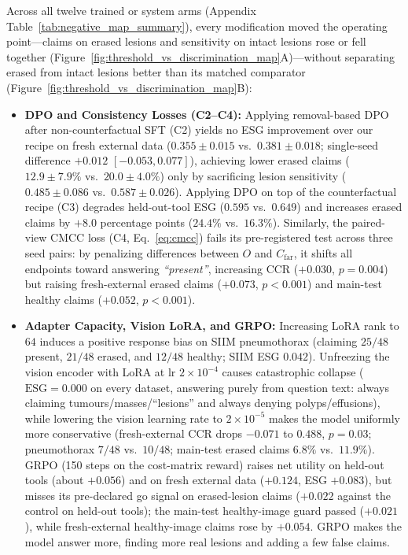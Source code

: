 \documentclass{article} %
\begin{document}
Across all twelve trained or system arms (Appendix Table~\ref{tab:negative_map_summary}), every modification moved the operating point---claims on erased lesions and sensitivity on intact lesions rose or fell together (Figure~\ref{fig:threshold_vs_discrimination_map}A)---without separating erased from intact lesions better than its matched comparator (Figure~\ref{fig:threshold_vs_discrimination_map}B):
\begin{itemize}[leftmargin=*,nosep]
    \item \textbf{DPO and Consistency Losses (C2--C4):} Applying removal-based DPO after non-counterfactual SFT (C2) yields no ESG improvement over our recipe on fresh external data ($0.355 \pm 0.015$ vs.\ $0.381 \pm 0.018$; single-seed difference $+0.012$ $[-0.053, 0.077]$), achieving lower erased claims ($12.9 \pm 7.9\%$ vs.\ $20.0 \pm 4.0\%$) only by sacrificing lesion sensitivity ($0.485 \pm 0.086$ vs.\ $0.587 \pm 0.026$). Applying DPO on top of the counterfactual recipe (C3) degrades held-out-tool ESG ($0.595$ vs.\ $0.649$) and increases erased claims by $+8.0$ percentage points ($24.4\%$ vs.\ $16.3\%$). Similarly, the paired-view CMCC loss (C4, Eq.~\ref{eq:cmcc}) fails its pre-registered test across three seed pairs: by penalizing differences between $O$ and $C_{\text{far}}$, it shifts all endpoints toward answering \emph{``present''}, increasing CCR ($+0.030$, $p=0.004$) but raising fresh-external erased claims ($+0.073$, $p<0.001$) and main-test healthy claims ($+0.052$, $p<0.001$).
    \item \textbf{Adapter Capacity, Vision LoRA, and GRPO:} Increasing LoRA rank to $64$ induces a positive response bias on SIIM pneumothorax (claiming $25/48$ present, $21/48$ erased, and $12/48$ healthy; SIIM ESG $0.042$). Unfreezing the vision encoder with LoRA at $\text{lr } 2\times 10^{-4}$ causes catastrophic collapse ($\text{ESG} = 0.000$ on every dataset, answering purely from question text: always claiming tumours/masses/``lesions'' and always denying polyps/effusions), while lowering the vision learning rate to $2\times 10^{-5}$ makes the model uniformly more conservative (fresh-external CCR drops $-0.071$ to $0.488$, $p=0.03$; pneumothorax $7/48$ vs.\ $10/48$; main-test erased claims $6.8\%$ vs.\ $11.9\%$). GRPO (150 steps on the cost-matrix reward) raises net utility on held-out tools (about $+0.056$) and on fresh external data ($+0.124$, ESG $+0.083$), but misses its pre-declared go signal on erased-lesion claims ($+0.022$ against the control on held-out tools); the main-test healthy-image guard passed ($+0.021$), while fresh-external healthy-image claims rose by $+0.054$. GRPO makes the model answer more, finding more real lesions and adding a few false claims.

\end{itemize}
\end{document}
